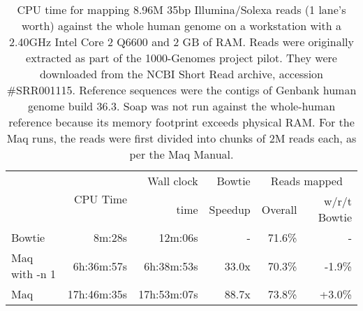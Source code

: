 \documentclass[letterpaper]{article}
\begin{document}
\begin{table}[tp]
\scriptsize
\begin{tabular}{lrrrrr}\toprule
 & \multirow{2}{*}{CPU Time} & Wall clock & Bowtie  & \multicolumn{2}{c}{Reads mapped} \\
 &                            & time       & Speedup & Overall    & w/r/t Bowtie \\[3pt]
\toprule
Bowtie & 8m:28s & 12m:06s & - & 71.6\% & - \\\midrule
Maq with -n 1 & 6h:36m:57s & 6h:38m:53s & 33.0x & 70.3\% & -1.9\% \\\midrule
Maq & 17h:46m:35s & 17h:53m:07s & 88.7x & 73.8\% & +3.0\% \\
\bottomrule
\end{tabular}
\caption{CPU time for mapping 8.96M 35bp Illumina/Solexa reads (1 lane's worth) against the whole human genome on a workstation with a 2.40GHz Intel Core 2 Q6600 and 2 GB of RAM. Reads were originally extracted as part of the 1000-Genomes project pilot. They were downloaded from the NCBI Short Read archive, accession \#SRR001115. Reference sequences were the contigs of Genbank human genome build 36.3. Soap was not run against the whole-human reference because its memory footprint exceeds physical RAM. For the Maq runs, the reads were first divided into chunks of 2M reads each, as per the Maq Manual.}
\end{table}
\end{document}
